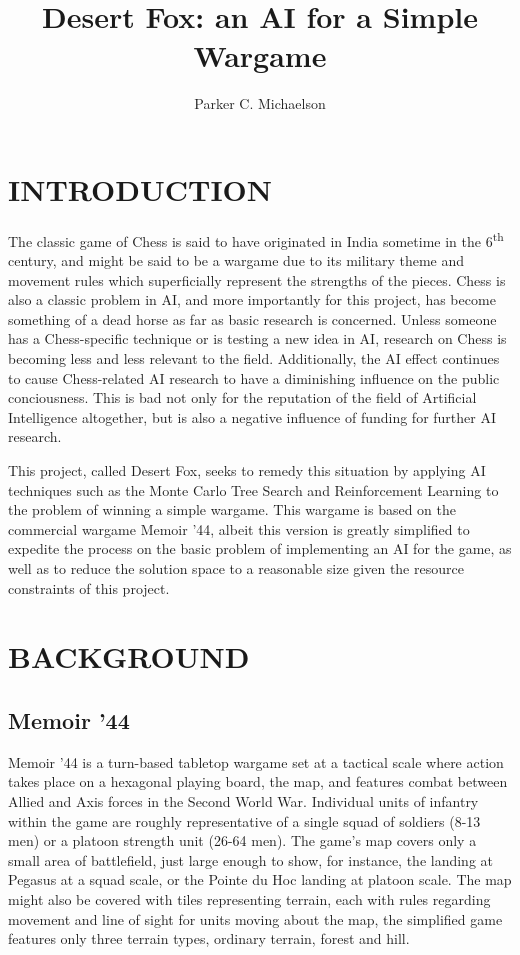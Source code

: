 \documentclass[twocolumn]{article}
\title{Desert Fox: an AI for a Simple Wargame}
\author{Parker C. Michaelson}
\begin{document}
\maketitle

\section{INTRODUCTION}

\indent
The classic game of Chess is said to have originated in India sometime in the 6\textsuperscript{th} century, and might be said to be a wargame due to its military theme and movement rules which superficially represent the strengths of the pieces.
Chess is also a classic problem in AI, and more importantly for this project, has become something of a dead horse as far as basic research is concerned.
Unless someone has a Chess-specific technique or is testing a new idea in AI, research on Chess is becoming less and less relevant to the field.
Additionally, the AI effect continues to cause Chess-related AI research to have a diminishing influence on the public conciousness.
This is bad not only for the reputation of the field of Artificial Intelligence altogether, but is also a negative influence of funding for further AI research.

This project, called Desert Fox, seeks to remedy this situation by applying AI techniques such as the Monte Carlo Tree Search and Reinforcement Learning to the problem of winning a simple wargame.
This wargame is based on the commercial wargame Memoir '44, albeit this version is greatly simplified to expedite the process on the basic problem of implementing an AI for the game, as well as to reduce the solution space to a reasonable size given the resource constraints of this project.


\section{BACKGROUND}

\subsection{Memoir '44}

Memoir '44 is a turn-based tabletop wargame set at a tactical scale where action takes place on a hexagonal playing board, the map, and features combat between Allied and Axis forces in the Second World War.
Individual units of infantry within the game are roughly representative of a single squad of soldiers (8-13 men) or a platoon strength unit (26-64 men).
The game's map covers only a small area of battlefield, just large enough to show, for instance, the landing at Pegasus at a squad scale, or the Pointe du Hoc landing at platoon scale.
The map might also be covered with tiles representing terrain, each with rules regarding movement and line of sight for units moving about the map, the simplified game features only three terrain types, ordinary terrain, forest and hill.
\end{document}
